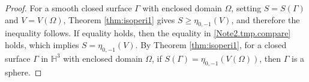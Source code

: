 \documentclass[10pt,a4paper]{amsart}
\newcommand{\HH}{\mathbb{H}}
\begin{document}
\begin{proof}
			For a smooth closed surface \(\Gamma\) with enclosed domain $\Omega$, setting \(S=S(\Gamma)\) and \(V=V(\Omega)\), Theorem \ref{thm:isoperi1} gives $S \geq \eta_{0,-1}(V)$, and therefore the inequality follows.
			If equality holds, then the equality in \eqref{Note2.tmp.compare} holds, which implies $S = \eta_{0,-1}(V)$. By Theorem \ref{thm:isoperi1}, for a closed surface $\Gamma$ in $\HH^3$ with enclosed domain $\Omega$, if $S(\Gamma) = \eta_{0,-1}(V(\Omega))$, then $\Gamma$ is a sphere.
		\end{proof}
\end{document}
